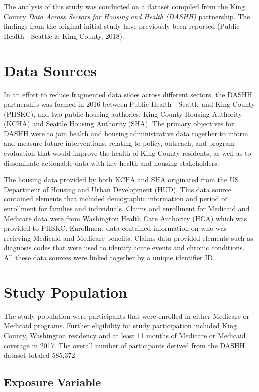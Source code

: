 \documentclass [11pt, proquest] {uwthesis}[2015/03/03]
\begin{document}
The analysis of this study was conducted on a dataset compiled from the
King County \emph{Data Across Sectors for Housing and Health (DASHH)}
partnership. The findings from the original initial study have
previously been reported (Public Health - Seattle \& King County, 2018).

\section{Data Sources}\label{data-sources}

In an effort to reduce fragmented data siloes across different sectors,
the DASHH partnership was formed in 2016 between Public Health - Seattle
and King County (PHSKC), and two public housing authories, King County
Housing Authority (KCHA) and Seattle Housing Authority (SHA). The
primary objectives for DASHH were to join health and housing
administrative data together to inform and measure future interventions,
relating to policy, outreach, and program evaluation that would improve
the health of King County residents, as well as to disseminate
actionable data with key health and housing stakeholders.

The housing data provided by both KCHA and SHA originated from the US
Department of Housing and Urban Development (HUD). This data source
contained elements that included demographic information and period of
enrollment for families and individuals. Claims and enrollment for
Medicaid and Medicare data were from Washington Health Care Authority
(HCA) which was provided to PHSKC. Enrollment data contained information
on who was recieving Medicaid and Medicare benefits. Claims data
provided elements such as diagnosis codes that were used to identify
acute events and chronic conditions. All these data sources were linked
together by a unique identifier ID.

\section{Study Population}\label{study-population}

The study population were participants that were enrolled in either
Medicare or Medicaid programs. Further eligibility for study
participation included King County, Washington residency and at least 11
months of Medicare or Medicaid coverage in 2017. The overall number of
participants derived from the DASHH dataset totaled 585,372.

\subsection{Exposure Variable}\label{exposure-variable}
\end{document}
